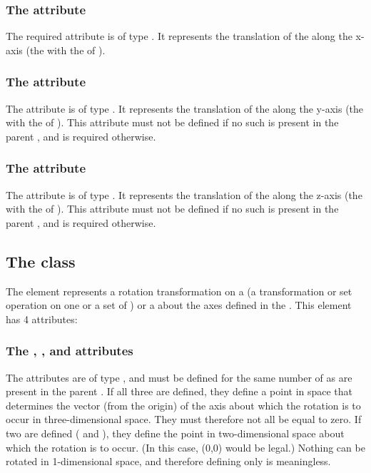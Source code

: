 \subsubsection{The \fixttspace{} attribute}
The  required attribute is of type . It represents the translation of the \CSGNode along the x-axis (the \CoordinateComponent with the  of ).

\subsubsection{The \fixttspace{} attribute}
The  attribute is of type . It represents the translation of the \CSGNode along the y-axis (the \CoordinateComponent with the  of ).  This attribute must not be defined if no such \CoordinateComponent is present in the parent \Geometry, and is required otherwise.

\subsubsection{The \fixttspace{} attribute}
The  attribute is of type . It represents the translation of the \CSGNode along the z-axis (the \CoordinateComponent with the  of ).  This attribute must not be defined if no such \CoordinateComponent is present in the parent \Geometry, and is required otherwise.


\subsection{The  class}
\label{csgrotation-class}
The \CSGRotation element represents a rotation transformation on a \CSGNode (a transformation or set operation on one or a set of \CSGPrimitives) or a \CSGPrimitive about the axes defined in the \Geometry. This element has 4 attributes:

\subsubsection{The \fixttspace{}, , and  attributes}
The  attributes are of type , and must be defined for the same number of \CoordinateComponents as are present in the parent \Geometry.  If all three are defined, they define a point in space that determines the vector (from the origin) of the axis about which the rotation is to occur in three-dimensional space.  They must therefore not all be equal to zero.  If two are defined ( and ), they define the point in two-dimensional space about which the rotation is to occur.  (In this case, (0,0) would be legal.)  Nothing can be rotated in 1-dimensional space, and therefore defining only  is meaningless.

